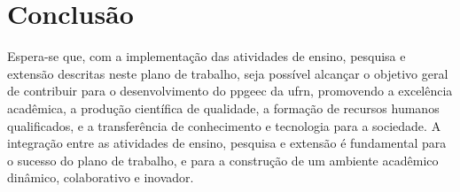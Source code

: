 \documentclass{article}
\begin{document}
\section{Conclusão}

Espera-se que, com a implementação das atividades de ensino, pesquisa e extensão descritas neste plano de trabalho, seja possível alcançar o objetivo geral de contribuir para o desenvolvimento do \gls{ppgeec} da \gls{ufrn}, promovendo a excelência acadêmica, a produção científica de qualidade, a formação de recursos humanos qualificados, e a transferência de conhecimento e tecnologia para a sociedade. A integração entre as atividades de ensino, pesquisa e extensão é fundamental para o sucesso do plano de trabalho, e para a construção de um ambiente acadêmico dinâmico, colaborativo e inovador.

\printglossaries %
\printbibliography
\end{document}
